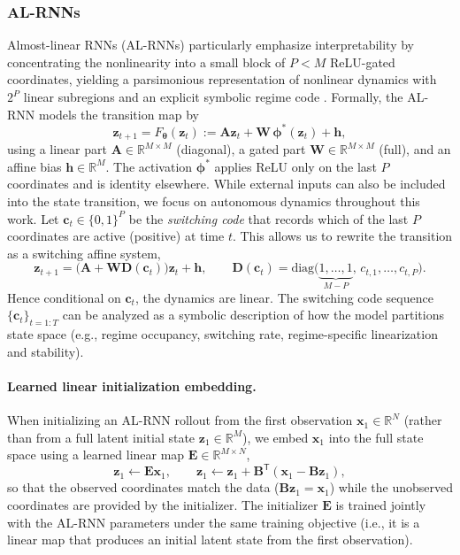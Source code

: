 \documentclass[twoside]{article}
\theoremstyle{plain}
\theoremstyle{definition}
\theoremstyle{remark}
\begin{document}
\subsubsection{AL-RNNs}
Almost-linear RNNs (AL-RNNs) particularly emphasize interpretability by concentrating the nonlinearity into a small block of $P < M$ ReLU-gated coordinates, yielding a parsimonious representation of nonlinear dynamics with $2^P$ linear subregions and an explicit symbolic regime code \citep{brenner2024alrnn,brenner2026uncovering}.
Formally, the AL-RNN models the transition map by 
\begin{equation}
\label{eq:a:alrnn}
\bm{z}_{t+1}
= F_{\bm\theta}(\bm{z}_t)
:= \bm{A} \bm{z}_t + \bm{W}\,\bm\phi^\ast(\bm{z}_t) + \bm{h},
\end{equation}
using a linear part $\bm{A} \in \mathbb{R}^{M\times M}$ (diagonal), a gated part $\bm{W} \in \mathbb{R}^{M\times M}$ (full), and an affine bias $\bm{h} \in \mathbb{R}^M$. The activation $\bm\phi^\ast$ applies ReLU only on the last $P$ coordinates and is identity elsewhere. While external inputs can also be included into the state transition, we focus on autonomous dynamics throughout this work. Let $\bm{c}_t\in\{0,1\}^P$ be the 
\emph{switching code} that records which of the last $P$ coordinates are active (positive) at time $t$. This allows us to rewrite the transition as a switching affine system,
\begin{equation}
\label{eq:alrnnswitching}
\bm z_{t+1} = \big(\bm A+\bm W\bm D(\bm c_t)\big)\bm z_t + \bm h,
\qquad
\bm{D}(\bm{c}_t)
=\mathrm{diag}\big( \underbrace{1,\dots,1}_{M-P},\,c_{t,1},\dots,c_{t,P} \big).
\end{equation}
Hence conditional on $\bm c_t$, the dynamics are linear. The switching code sequence
$\{\bm c_t\}_{t=1:T}$ can be analyzed as a symbolic description of how the model partitions state space (e.g., regime occupancy, switching rate, regime-specific linearization and stability).

\paragraph{Learned linear initialization embedding.}
When initializing an AL-RNN rollout from the first observation $\bm x_1\in\mathbb{R}^N$ (rather than from a full latent initial state $\bm z_1\in\mathbb{R}^M$), we embed $\bm x_1$ into the full state space using a learned linear map $\bm E\in\mathbb{R}^{M\times N}$,
\begin{equation}
\label{eq:alrnn_init_embed}
\bm z_1 \leftarrow \bm E\bm x_1,\qquad \bm z_1 \leftarrow \bm z_1 + \bm B^{\mathsf T}(\bm x_1-\bm B\bm z_1),
\end{equation}
so that the observed coordinates match the data ($\bm B\bm z_1=\bm x_1$) while the unobserved coordinates are provided by the initializer.
The initializer $\bm E$ is trained jointly with the AL-RNN parameters under the same training objective (i.e., it is a linear map that produces an initial latent state from the first observation).
\end{document}
